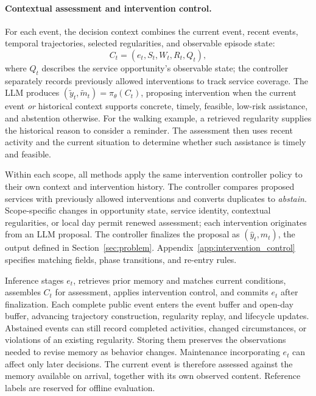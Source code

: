 \paragraph{Contextual assessment and intervention control.}
For each event, the decision context combines the current event, recent events, temporal trajectories, selected regularities, and observable episode state:
\begin{equation}
C_t=(e_t,S_t,W_t,R_t,Q_t),
\label{eq:decision_context}
\end{equation}
where $Q_t$ describes the service opportunity's observable state; the controller separately records previously allowed interventions to track service coverage.
The LLM produces $(\tilde y_t,\tilde m_t)=\pi_\theta(C_t)$, proposing intervention when the current event \emph{or} historical context supports concrete, timely, feasible, low-risk assistance, and abstention otherwise.
For the walking example, a retrieved regularity supplies the historical reason to consider a reminder.
The assessment then uses recent activity and the current situation to determine whether such assistance is timely and feasible.

Within each scope, all methods apply the same intervention controller policy to their own context and intervention history.
The controller compares proposed services with previously allowed interventions and converts duplicates to \emph{abstain}.
Scope-specific changes in opportunity state, service identity, contextual regularities, or local day permit renewed assessment; each intervention originates from an LLM proposal.
The controller finalizes the proposal as $(\hat y_t,\hat m_t)$, the output defined in Section~\ref{sec:problem}.
Appendix~\ref{app:intervention_control} specifies matching fields, phase transitions, and re-entry rules.

Inference stages $e_t$, retrieves prior memory and matches current conditions, assembles $C_t$ for assessment, applies intervention control, and commits $e_t$ after finalization.
Each complete public event enters the event buffer and open-day buffer, advancing trajectory construction, regularity replay, and lifecycle updates.
Abstained events can still record completed activities, changed circumstances, or violations of an existing regularity.
Storing them preserves the observations needed to revise memory as behavior changes.
Maintenance incorporating $e_t$ can affect only later decisions.
The current event is therefore assessed against the memory available on arrival, together with its own observed content.
Reference labels are reserved for offline evaluation.
